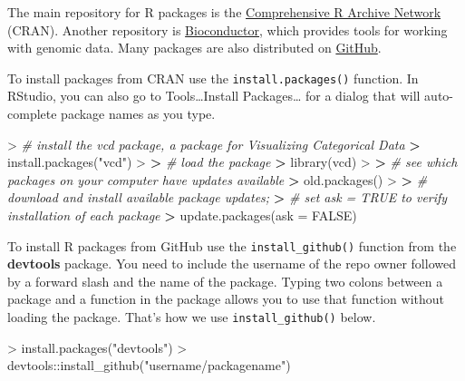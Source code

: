 \documentclass[
]{book}
\newenvironment{Shaded}{\begin{snugshade}}{\end{snugshade}}
\newcommand{\AttributeTok}[1]{\textcolor[rgb]{0.77,0.63,0.00}{#1}}
\newcommand{\CommentTok}[1]{\textcolor[rgb]{0.56,0.35,0.01}{\textit{#1}}}
\newcommand{\ConstantTok}[1]{\textcolor[rgb]{0.00,0.00,0.00}{#1}}
\newcommand{\ErrorTok}[1]{\textcolor[rgb]{0.64,0.00,0.00}{\textbf{#1}}}
\newcommand{\FunctionTok}[1]{\textcolor[rgb]{0.00,0.00,0.00}{#1}}
\newcommand{\NormalTok}[1]{#1}
\newcommand{\SpecialCharTok}[1]{\textcolor[rgb]{0.00,0.00,0.00}{#1}}
\newcommand{\StringTok}[1]{\textcolor[rgb]{0.31,0.60,0.02}{#1}}
\begin{document}
The main repository for R packages is the \href{https://cran.r-project.org/}{Comprehensive R Archive Network} (CRAN). Another repository is \href{https://www.bioconductor.org/}{Bioconductor}, which provides tools for working with genomic data. Many packages are also distributed on \href{https://github.com/}{GitHub}.

To install packages from CRAN use the \texttt{install.packages()} function. In RStudio, you can also go to Tools\ldots Install Packages\ldots{} for a dialog that will auto-complete package names as you type.

\begin{Shaded}
\begin{Highlighting}[]
\SpecialCharTok{\textgreater{}} \CommentTok{\# install the vcd package, a package for Visualizing Categorical Data}
\ErrorTok{\textgreater{}} \FunctionTok{install.packages}\NormalTok{(}\StringTok{"vcd"}\NormalTok{)}
\SpecialCharTok{\textgreater{}} 
\ErrorTok{\textgreater{}} \CommentTok{\# load the package}
\ErrorTok{\textgreater{}} \FunctionTok{library}\NormalTok{(vcd)}
\SpecialCharTok{\textgreater{}} 
\ErrorTok{\textgreater{}} \CommentTok{\# see which packages on your computer have updates available}
\ErrorTok{\textgreater{}} \FunctionTok{old.packages}\NormalTok{()}
\SpecialCharTok{\textgreater{}} 
\ErrorTok{\textgreater{}} \CommentTok{\# download and install available package updates;}
\ErrorTok{\textgreater{}} \CommentTok{\# set ask = TRUE to verify installation of each package}
\ErrorTok{\textgreater{}} \FunctionTok{update.packages}\NormalTok{(}\AttributeTok{ask =} \ConstantTok{FALSE}\NormalTok{)}
\end{Highlighting}
\end{Shaded}

To install R packages from GitHub use the \texttt{install\_github()} function from the \textbf{devtools} package. You need to include the username of the repo owner followed by a forward slash and the name of the package. Typing two colons between a package and a function in the package allows you to use that function without loading the package. That's how we use \texttt{install\_github()} below.

\begin{Shaded}
\begin{Highlighting}[]
\SpecialCharTok{\textgreater{}} \FunctionTok{install.packages}\NormalTok{(}\StringTok{"devtools"}\NormalTok{)}
\SpecialCharTok{\textgreater{}}\NormalTok{ devtools}\SpecialCharTok{::}\FunctionTok{install\_github}\NormalTok{(}\StringTok{"username/packagename"}\NormalTok{)}
\end{Highlighting}
\end{Shaded}
\end{document}
